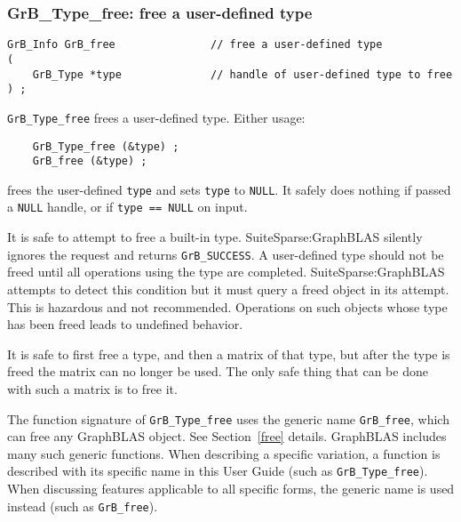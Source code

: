 \documentclass[12pt]{article}
\begin{document}
\newpage
\subsubsection{{\sf GrB\_Type\_free:} free a user-defined type}
\label{type_free}

\begin{mdframed}[userdefinedwidth=6in]
{\footnotesize
\begin{verbatim}
GrB_Info GrB_free               // free a user-defined type
(
    GrB_Type *type              // handle of user-defined type to free
) ;
\end{verbatim}
}\end{mdframed}

\verb'GrB_Type_free' frees a user-defined type.
Either usage:

    {\small
    \begin{verbatim}
    GrB_Type_free (&type) ;
    GrB_free (&type) ; \end{verbatim}}

\noindent
frees the user-defined \verb'type' and
sets \verb'type' to \verb'NULL'.
It safely does nothing if passed a \verb'NULL'
handle, or if \verb'type == NULL' on input.

It is safe to attempt to free a built-in type.  SuiteSparse:GraphBLAS silently
ignores the request and returns \verb'GrB_SUCCESS'.  A user-defined type should
not be freed until all operations using the type are completed.
SuiteSparse:GraphBLAS attempts to detect this condition but it must query a
freed object in its attempt.  This is hazardous and not recommended.
Operations on such objects whose type has been freed leads to undefined
behavior.

It is safe to first free a type, and then a matrix of that type, but after the
type is freed the matrix can no longer be used.  The only safe thing that can
be done with such a matrix is to free it.

The function signature of \verb'GrB_Type_free' uses the generic name
\verb'GrB_free', which can free any GraphBLAS object. See Section~\ref{free}
details.  GraphBLAS includes many such generic functions.  When describing a
specific variation, a function is described with its specific name in this User
Guide (such as \verb'GrB_Type_free').  When discussing features applicable to
all specific forms, the generic name is used instead (such as \verb'GrB_free').
\end{document}
